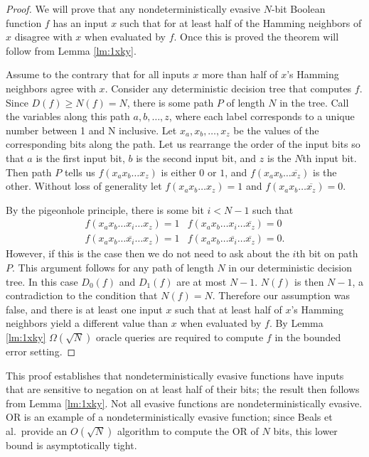 \begin{proof}
We will prove that any nondeterministically evasive $N$-bit Boolean
function $f$ has an input $x$ such that for at least half of the
Hamming neighbors of $x$ disagree with $x$ when evaluated by $f$.
Once this is proved the theorem will follow from Lemma \ref{lm:1xky}.

Assume to the contrary that for all inputs $x$ more than half of $x$'s
Hamming neighbors agree with $x$.  Consider any deterministic decision
tree that computes $f$.  Since $D(f) \ge N(f) = N$, there is some path
$P$ of length $N$ in the tree.  Call the variables along this path $a,
b, \ldots , z$, where each label corresponds to a unique number
between 1 and N inclusive.  Let $x_{a}, x_{b}, \ldots , x_{z}$ be the
values of the corresponding bits along the path.  Let us rearrange the
order of the input bits so that $a$ is the first input bit, $b$ is the
second input bit, and $z$ is the $N$th input bit.  Then path $P$ tells
us $f(x_{a}x_{b}\ldots x_{z})$ is either $0$ or $1$, and
$f(x_{a}x_{b}\ldots\overline{x_{z}})$ is the other.  Without loss of
generality let $f(x_{a}x_{b}\ldots x_{z}) = 1$ and
$f(x_{a}x_{b}\ldots\overline{x_{z}}) = 0$.

By the pigeonhole principle, there is some bit $i < N-1$ such that
\[
\begin{array}{ll}
	f(x_{a}x_{b}\ldots x_{i}\ldots x_{z}) = 1 & 	f(x_{a}x_{b}\ldots x_{i} \ldots \overline{x_{z}}) = 0 \\
	f(x_{a}x_{b}\ldots\overline{x_{i}}\ldots x_{z}) = 1 & 	f(x_{a}x_{b}\ldots\overline{x_{i}}\ldots\overline{x_{z}}) = 0 .
\end{array}
\]
However, if this is the case then we do not need to ask about the
$i$th bit on path $P$.  This argument follows for any path of length
$N$ in our deterministic decision tree.  In this case $D_{0}(f)$ and
$D_{1}(f)$ are at most $N-1$.  $N(f)$ is then $N-1$, a contradiction
to the condition that $N(f) = N$.  Therefore our assumption was false,
and there is at least one input $x$ such that at least half of $x$'s
Hamming neighbors yield a different value than $x$ when evaluated by
$f$.  By Lemma \ref{lm:1xky} $\Omega(\sqrt{N})$ oracle queries are
required to compute $f$ in the bounded error setting.
\end{proof}

This proof establishes that nondeterministically evasive functions
have inputs that are sensitive to negation on at least half of their
bits; the result then follows from Lemma \ref{lm:1xky}.  Not all
evasive functions are nondeterministically evasive.  OR is an example
of a nondeterministically evasive function; since Beals et al.\
provide an $O(\sqrt{N})$ algorithm to compute the OR of $N$ bits, this
lower bound is asymptotically tight.

